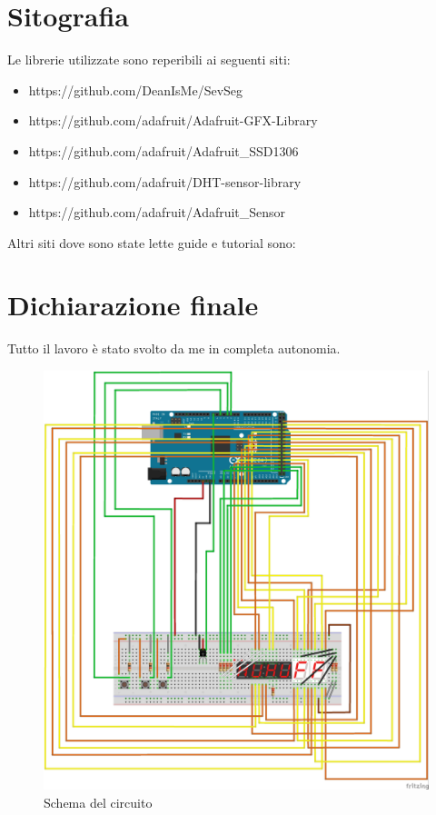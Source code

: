 \documentclass[paper=a4, fontsize=10pt]{scrartcl}
\begin{document}
\section{Sitografia}

Le librerie utilizzate sono reperibili ai seguenti siti:
\begin{itemize}
\item https://github.com/DeanIsMe/SevSeg
\item https://github.com/adafruit/Adafruit-GFX-Library
\item https://github.com/adafruit/Adafruit\_SSD1306
\item https://github.com/adafruit/DHT-sensor-library
\item https://github.com/adafruit/Adafruit\_Sensor
\end{itemize}

Altri siti dove sono state lette guide e tutorial
 sono:


\section{Dichiarazione finale}
Tutto il lavoro è stato svolto da me in completa autonomia.

\begin{figure}
  \includegraphics[width=\linewidth]{MySchema.jpg}
  \caption{Schema del circuito}
  \label{fig:schema1}
\end{figure}
\end{document}
